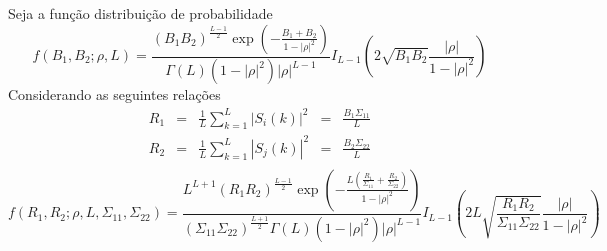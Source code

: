 Seja a função distribuição de probabilidade 
\begin{equation}\label{func_biv_produto_inten_b1_b2}
	f(B_1,B_2;\rho, L)=\frac{\left(B_1B_2\right)^{\frac{L-1}{2}}\exp\left(-\frac{B_1+B_2}{1-|\rho|^2}\right)}{\Gamma(L)(1-|\rho|^2)|\rho|^{L-1}}I_{L-1}\left(2\sqrt{B_1B_2}\frac{|\rho|}{1-|\rho|^2}\right)
\end{equation}
Considerando as seguintes relações 
\begin{equation}\label{eqn59}
\begin{array}{ccccc}
	R_1&=&\frac{1}{L}\sum_{k=1}^{L}|S_i(k)|^2&=&\frac{B_1\Sigma_{11}}{L}\\
	R_2&=&\frac{1}{L}\sum_{k=1}^{L}|S_j(k)|^2&=&\frac{B_2\Sigma_{22}}{L}\\
\end{array}
\end{equation}
\begin{equation}\label{fun_pdf_biv_inten}
	f(R_1,R_2;\rho,L, \Sigma_{11}, \Sigma_{22})=\frac{L^{L+1}\left(R_1R_2\right)^{\frac{L-1}{2}}\exp\left(-\frac{L\left(\frac{R_1}{\Sigma_{11}}+\frac{R_2}{\Sigma_{22}}\right)}{1-|\rho|^2}\right)}{(\Sigma_{11}\Sigma_{22})^{\frac{L+1}{2}}\Gamma(L)(1-|\rho|^2)|\rho|^{L-1}}I_{L-1}\left(2L\sqrt{\frac{R_1R_2}{\Sigma_{11}\Sigma_{22}}}\frac{|\rho|}{1-|\rho|^2}\right)
\end{equation}

